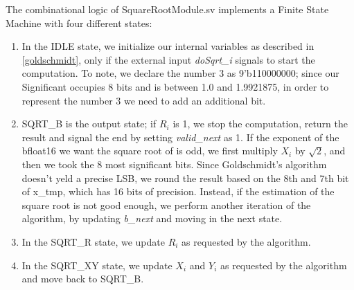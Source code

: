 The combinational logic of SquareRootModule.sv implements a Finite State Machine with four different states:
\begin{enumerate}
\item In the IDLE state, we initialize our internal variables as described in \ref{goldschmidt}, only if the external input \emph{doSqrt\_i} signals to start the computation. To note, we declare the number 3 as 9'b110000000; since our Significant occupies 8 bits and is between 1.0 and 1.9921875, in order to represent the number 3 we need to add an additional bit. 
\item SQRT\_B is the output state; if $R_i$ is 1, we stop the computation, return the result and signal the end by setting \emph{valid\_next} as 1. If the exponent of the bfloat16 we want the square root of is odd, we first multiply $X_i$ by $\sqrt{2}$, and then we took the 8 most significant bits. Since Goldschmidt's algorithm doesn't yeld a precise LSB, we round the result based on the 8th and 7th bit of x\_tmp, which has 16 bits of precision. Instead, if the estimation of the square root is not good enough, we perform another iteration of the algorithm, by updating \emph{b\_next} and moving in the next state.
\item In the SQRT\_R state, we update $R_i$ as requested by the algorithm.
\item In the SQRT\_XY state, we update $X_i$ and $Y_i$ as requested by the algorithm and move back to SQRT\_B.
\end{enumerate}


\clearpage
